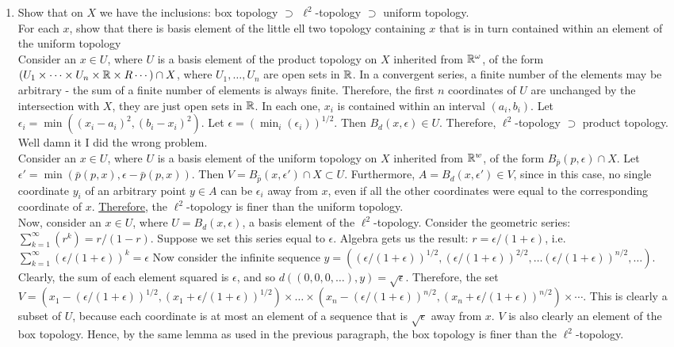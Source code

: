\documentclass[12pt,letterpaper]{article}
\begin{document}
\begin{enumerate}
  \begin{enumerate}
    \item Show that on $X$ we have the inclusions: box topology $\supset$ $\ell^2$-topology $\supset$ uniform topology. \\
    For each $x$, show that there is basis element of the little ell two topology containing $x$ that is in turn contained within an element of the uniform topology \\
    Consider an $x\in U$, where $U$ is a basis element of the product topology on $X$ inherited from $\mathbb{R}^\omega$, of the form $(U_1\times\dots\times U_n\times \mathbb{R}\times R\cdots)\cap X$, where $U_1,\dots,U_n$ are open sets in $\mathbb{R}$.
    In a convergent series, a finite number of the elements may be arbitrary - the sum of a finite number of elements is always finite. Therefore, the first $n$ coordinates of $U$ are unchanged by the intersection with $X$, they are just open sets in $\mathbb{R}$. In each one, $x_i$ is contained within an interval $(a_i, b_i)$. Let $\epsilon_i = \min((x_i-a_i)^2, (b_i-x_i)^2)$. Let $\epsilon=(\min_i(\epsilon_i))^{1/2}$. Then $B_d(x,\epsilon)\in U$. Therefore, $\ell^2$-topology $\supset$ product topology. Well damn it I did the wrong problem.\\
    Consider an $x\in U$, where $U$ is a basis element of the uniform topology on $X$ inherited from $\mathbb{R}^w$, of the form $B_{\bar{p}}(p,\epsilon)\cap X$. Let $\epsilon' = \min(\bar{p}(p,x), \epsilon - \bar{p}(p,x))$. Then $V=B_{\bar{p}}(x,\epsilon')\cap X \subset U$. Furthermore, $A=B_d(x, \epsilon') \in V$, since in this case, no single coordinate $y_i$ of an arbitrary point $y\in A$ can be $\epsilon_i$ away from $x$, even if all the other coordinates were equal to the corresponding coordinate of $x$. \hyperref[thm:basisFiner]{Therefore}, the $\ell^2$-topology is finer than the uniform topology. \\
    Now, consider an $x\in U$, where $U=B_d(x,\epsilon)$, a basis element of the $\ell^2$-topology. Consider the geometric series: $\sum_{k=1}^\infty(r^k) = r/(1-r)$. Suppose we set this series equal to $\epsilon$. Algebra gets us the result: $r=\epsilon/(1+\epsilon)$, i.e. $\sum_{k=1}^\infty(\epsilon/(1+\epsilon))^k = \epsilon$ Now consider the infinite sequence $y=((\epsilon/(1+\epsilon))^{1/2}, (\epsilon/(1+\epsilon))^{2/2},\dots (\epsilon/(1+\epsilon))^{n/2},\dots)$. Clearly, the sum of each element squared is $\epsilon$, and so $d((0,0,0,\dots),y)=\sqrt{\epsilon}$. Therefore, the set $V = (x_1-(\epsilon/(1+\epsilon))^{1/2}, (x_1+\epsilon/(1+\epsilon))^{1/2})\times \dots \times(x_n-(\epsilon/(1+\epsilon))^{n/2}, (x_n+\epsilon/(1+\epsilon))^{n/2})\times \cdots$. This is clearly a subset of $U$, because each coordinate is at most an element of a sequence that is $\sqrt{\epsilon}$ away from $x$. $V$ is also clearly an element of the box topology. Hence, by the same lemma as used in the previous paragraph, the box topology is finer than the $\ell^2$-topology.

\end{enumerate}
\end{enumerate}
\end{document}

